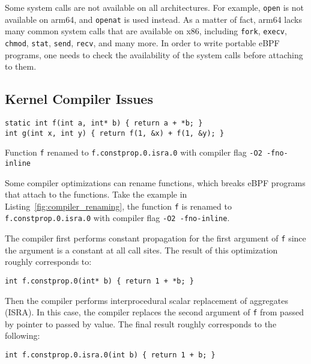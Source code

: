 Some system calls are not available on all architectures.
For example, \texttt{open} is not available on arm64, and \texttt{openat} is used instead. 
As a matter of fact, arm64 lacks many common system calls that are available on x86, including \texttt{fork}, \texttt{execv}, \texttt{chmod}, \texttt{stat}, \texttt{send}, \texttt{recv}, and many more.
In order to write portable eBPF programs, one needs to check the availability of the system calls before attaching to them.




\subsection{Kernel Compiler Issues}

\begin{listing}[t]
\begin{verbatim}
static int f(int a, int* b) { return a + *b; }
int g(int x, int y) { return f(1, &x) + f(1, &y); }
\end{verbatim}
\caption{Function \texttt{f} renamed to \texttt{f.constprop.0.isra.0} with compiler flag \texttt{-O2 -fno-inline}}
\label{fig:compiler_renaming}
\end{listing}



Some compiler optimizations can rename functions, which breaks eBPF programs that attach to the functions.
Take the example in Listing~\ref{fig:compiler_renaming}, the function \texttt{f} is renamed to \texttt{f.constprop.0.isra.0} with compiler flag \texttt{-O2 -fno-inline}.

The compiler first performs constant propagation for the first argument of \texttt{f} since the argument is a constant at all call sites. 
The result of this optimization roughly corresponds to:
\begin{verbatim}
int f.constprop.0(int* b) { return 1 + *b; }
\end{verbatim}

Then the compiler performs interprocedural scalar replacement of aggregates (ISRA).
In this case, the compiler replaces the second argument of \texttt{f} from passed by pointer to passed by value. 
The final result roughly corresponds to the following:
\begin{verbatim}
int f.constprop.0.isra.0(int b) { return 1 + b; }
\end{verbatim}

